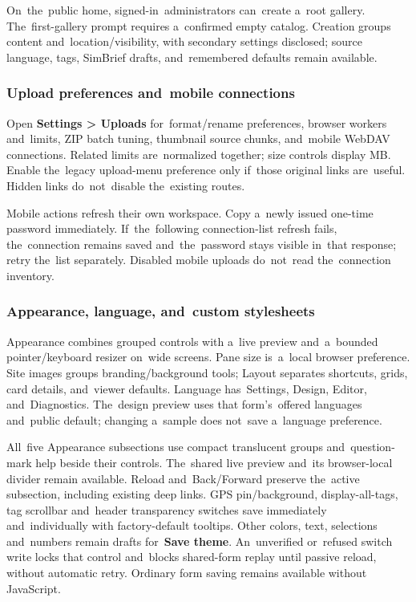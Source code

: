 \documentclass[11pt,a4paper]{article}
\newcommand{\ui}[1]{\textbf{#1}}
\begin{document}
On~the~public home, signed-in~administrators can~create a~root gallery.
The~first-gallery prompt requires a~confirmed empty catalog. Creation groups
content and~location/visibility, with secondary settings disclosed; source
language, tags, SimBrief drafts, and~remembered defaults remain available.

\subsubsection{Upload preferences and~mobile connections}
Open \ui{Settings > Uploads} for~format/rename preferences, browser workers
and~limits, ZIP batch tuning, thumbnail source chunks, and~mobile WebDAV
connections. Related limits are~normalized together; size controls display MB.
Enable the~legacy upload-menu preference only if~those original links
are~useful. Hidden links do~not~disable the~existing routes.

Mobile actions refresh their own workspace. Copy a~newly issued one-time
password immediately. If~the~following connection-list refresh fails,
the~connection remains saved and~the~password stays visible in~that response;
retry the~list separately. Disabled mobile uploads do~not~read the~connection
inventory.

\subsubsection{Appearance, language, and~custom stylesheets}
Appearance combines grouped controls with a~live preview and~a~bounded
pointer/keyboard resizer on~wide screens. Pane size is~a~local browser
preference. Site images groups branding/background tools; Layout separates
shortcuts, grids, card details, and~viewer defaults. Language has~Settings,
Design, Editor, and~Diagnostics. The~design preview uses that form's~offered
languages and~public default; changing a~sample does not~save a~language
preference.

All~five Appearance subsections use compact translucent groups and~question-mark
help beside their controls. The~shared live preview and~its browser-local
divider
remain available. Reload and~Back/Forward preserve the~active subsection,
including
existing deep links. GPS pin/background, display-all-tags, tag scrollbar
and~header
transparency switches save immediately and~individually with factory-default
tooltips. Other colors, text, selections and~numbers remain drafts for~\ui{Save
theme}.
An~unverified or~refused switch write locks that control and~blocks shared-form
replay until passive reload, without automatic retry. Ordinary form saving
remains available without JavaScript.
\end{document}

